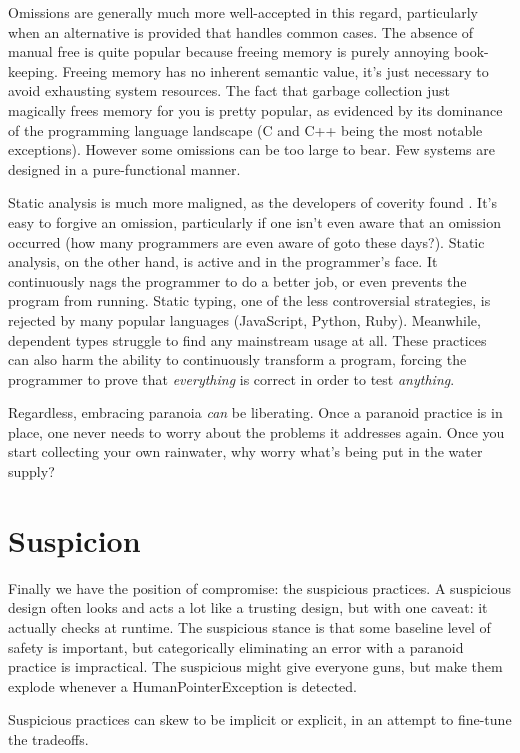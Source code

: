 Omissions are generally much more well-accepted in this regard, particularly
when an alternative is provided that handles common cases. The
absence of manual free is quite popular because freeing memory is purely annoying
book-keeping. Freeing memory has no inherent semantic value, it's just necessary
to avoid exhausting system resources. The fact that garbage collection just
magically frees memory for you is pretty popular, as evidenced by its dominance
of the programming language landscape (C and C++ being the most notable exceptions).
However some omissions can be too large to bear. Few systems are designed in
a pure-functional manner.

Static analysis is much more maligned, as the developers of coverity found
\cite{bessey2010few}. It's easy to forgive an omission, particularly if one isn't
even aware that an omission occurred (how many programmers are even aware of
goto these days?). Static analysis, on the other hand, is active and in the programmer's face.
It continuously nags the programmer to do a better job, or even prevents the
program from running. Static typing, one of the less controversial
strategies, is rejected by many popular languages (JavaScript, Python, Ruby).
Meanwhile, dependent types struggle to find any mainstream usage at all. These practices
can also harm the ability to continuously transform a program, forcing the
programmer to prove that \emph{everything} is correct in order to test \emph{anything}.

Regardless, embracing paranoia \emph{can} be liberating. Once a paranoid
practice is in place, one never needs to worry about the problems it addresses
again. Once you start collecting your own rainwater, why worry what's being put
in the water supply?




\section{Suspicion}

Finally we have the position of compromise: the suspicious practices. A suspicious
design often looks and acts a lot like a trusting design, but with one caveat: it
actually checks at runtime. The suspicious stance is that some baseline level of
safety is important, but categorically eliminating an error with a paranoid practice
is impractical. The suspicious might give everyone guns, but make them explode whenever
a HumanPointerException is detected.

Suspicious practices can skew to be implicit or explicit, in an
attempt to fine-tune the tradeoffs.

